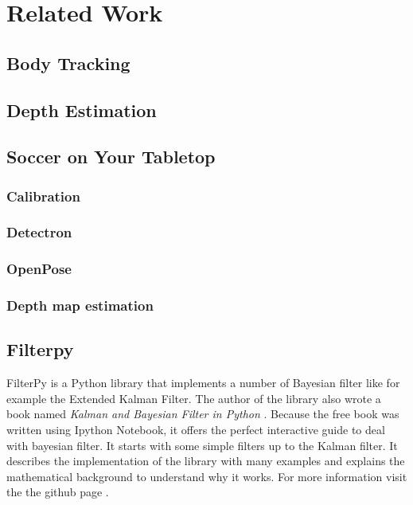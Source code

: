 \chapter{Related Work}

\section{Body Tracking}

\section{Depth Estimation}

\section{Soccer on Your Tabletop}\label{tabletop}

\subsection{Calibration}\label{tablecalibration}

\subsection{Detectron}

\subsection{OpenPose}

\subsection{Depth map estimation}

\section{Filterpy}
FilterPy is a Python library that implements a number of Bayesian filter like for example the Extended Kalman Filter. The author of the library also wrote a book named \textit{Kalman and Bayesian Filter in Python} \cite{filterpybook}. Because the free book was written using Ipython Notebook, it offers the perfect interactive guide to deal with bayesian filter. It starts with some simple filters up to the Kalman filter. It describes the implementation of the library with many examples and explains the mathematical background to understand why it works. For more information visit the the github page \cite{filterpygithub}. 